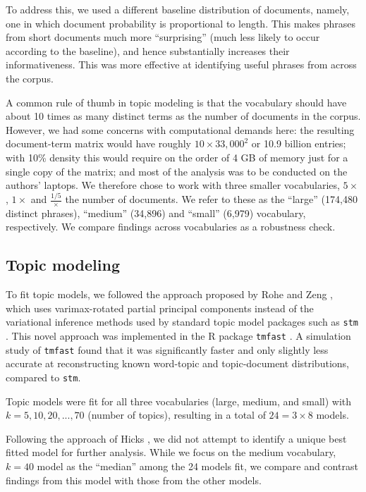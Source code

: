 \documentclass[12pt]{article}
\begin{document}
To address this, we used a different baseline distribution of documents, namely, one in which document probability is proportional to length. This makes phrases from short documents much more ``surprising'' (much less likely to occur according to the baseline), and hence substantially increases their informativeness. This was more effective at identifying useful phrases from across the corpus.

A common rule of thumb in topic modeling is that the vocabulary should have about 10 times as many distinct terms as the number of documents in the corpus. However, we had some concerns with computational demands here: the resulting document-term matrix would have roughly \(10 \times 33,000^2\) or 10.9 billion entries; with 10\% density this would require on the order of 4 GB of memory just for a single copy of the matrix; and most of the analysis was to be conducted on the authors' laptops. We therefore chose to work with three smaller vocabularies, \(5 \times\), \(1 \times\) and \(\frac{1/5} \times\) the number of documents. We refer to these as the ``large'' (174,480 distinct phrases), ``medium'' (34,896) and ``small'' (6,979) vocabulary, respectively. We compare findings across vocabularies as a robustness check.

\hypertarget{topic-modeling}{%
\subsection{Topic modeling}\label{topic-modeling}}

To fit topic models, we followed the approach proposed by Rohe and Zeng \cite{RoheVintageFactorAnalysis2020}, which uses varimax-rotated partial principal components instead of the variational inference methods used by standard topic model packages such as \texttt{stm} \cite{RobertsStmPackageStructural2019}. This novel approach was implemented in the R package \texttt{tmfast} \cite{HicksTmfastFitsTopic2023}. A simulation study of \texttt{tmfast} found that it was significantly faster and only slightly less accurate at reconstructing known word-topic and topic-document distributions, compared to \texttt{stm}.

Topic models were fit for all three vocabularies (large, medium, and small) with \(k = 5, 10, 20, ..., 70\) (number of topics), resulting in a total of \(24 = 3 \times 8\) models.

Following the approach of Hicks \cite{HicksProductivityInterdisciplinaryImpacts2021}, we did not attempt to identify a unique best fitted model for further analysis. While we focus on the medium vocabulary, \(k=40\) model as the ``median'' among the 24 models fit, we compare and contrast findings from this model with those from the other models.
\end{document}

